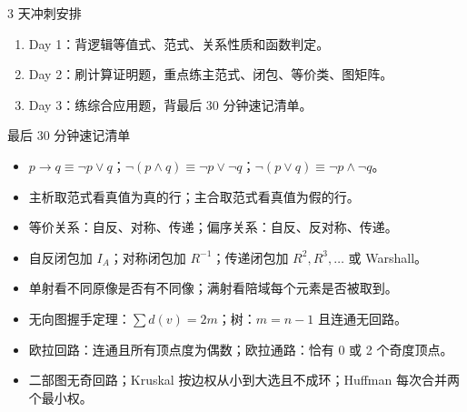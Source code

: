 \documentclass[UTF8,zihao=-4]{ctexart}
\begin{document}
\begin{methodbox}{3 天冲刺安排}
\begin{enumerate}
  \item Day 1：背逻辑等值式、范式、关系性质和函数判定。
  \item Day 2：刷计算证明题，重点练主范式、闭包、等价类、图矩阵。
  \item Day 3：练综合应用题，背最后 30 分钟速记清单。
\end{enumerate}
\end{methodbox}

\begin{exambox}{最后 30 分钟速记清单}
\begin{itemize}
  \item $p\to q\equiv \neg p\lor q$；$\neg(p\land q)\equiv\neg p\lor\neg q$；$\neg(p\lor q)\equiv\neg p\land\neg q$。
  \item 主析取范式看真值为真的行；主合取范式看真值为假的行。
  \item 等价关系：自反、对称、传递；偏序关系：自反、反对称、传递。
  \item 自反闭包加 $I_A$；对称闭包加 $R^{-1}$；传递闭包加 $R^2,R^3,\ldots$ 或 Warshall。
  \item 单射看不同原像是否有不同像；满射看陪域每个元素是否被取到。
  \item 无向图握手定理：$\sum d(v)=2m$；树：$m=n-1$ 且连通无回路。
  \item 欧拉回路：连通且所有顶点度为偶数；欧拉通路：恰有 0 或 2 个奇度顶点。
  \item 二部图无奇回路；Kruskal 按边权从小到大选且不成环；Huffman 每次合并两个最小权。
\end{itemize}
\end{exambox}
\end{document}
